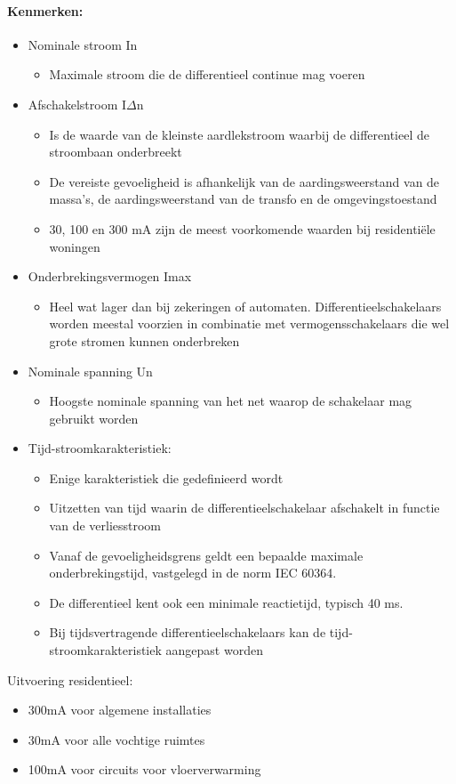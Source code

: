 \documentclass[12pt]{article}
\begin{document}
\paragraph{Kenmerken:}
\begin{itemize}
    \item Nominale stroom In\begin{itemize}
        \item Maximale stroom die de differentieel continue mag voeren
    \end{itemize}
    \item Afschakelstroom I$\Delta$n\begin{itemize}
        \item Is de waarde van de kleinste aardlekstroom waarbij de differentieel de stroombaan onderbreekt
        \item De vereiste gevoeligheid is afhankelijk van de aardingsweerstand van de massa's, de aardingsweerstand van de transfo en de omgevingstoestand
        \item 30, 100 en 300 mA zijn de meest voorkomende waarden bij residentiële woningen
    \end{itemize}
    \item Onderbrekingsvermogen Imax\begin{itemize}
        \item Heel wat lager dan bij zekeringen of automaten. Differentieelschakelaars worden meestal voorzien in combinatie met vermogensschakelaars die wel grote stromen kunnen onderbreken
    \end{itemize}
    \item Nominale spanning Un\begin{itemize}
        \item Hoogste nominale spanning van het net waarop de schakelaar mag gebruikt worden
    \end{itemize}
    \item Tijd-stroomkarakteristiek:\begin{itemize}
        \item Enige karakteristiek die gedefinieerd wordt
        \item Uitzetten van tijd waarin de differentieelschakelaar afschakelt in functie van de verliesstroom
        \item Vanaf de gevoeligheidsgrens geldt een bepaalde maximale onderbrekingstijd, vastgelegd in de norm IEC 60364.
        \item De differentieel kent ook een minimale reactietijd, typisch 40 ms.
        \item Bij tijdsvertragende differentieelschakelaars kan de tijd-stroomkarakteristiek aangepast worden
    \end{itemize}
\end{itemize}
Uitvoering residentieel:
\begin{itemize}
    \item 300mA voor algemene installaties
    \item 30mA voor alle vochtige ruimtes
    \item 100mA voor circuits voor vloerverwarming
\end{itemize}
\end{document}
